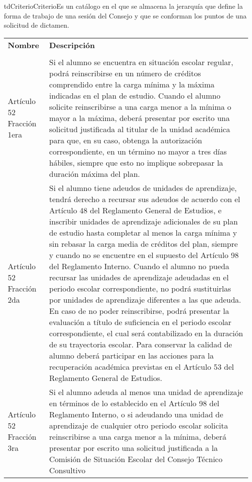 \begin{TipoDeDato}{tdCriterio}{Criterio}{Es un catálogo en el que se almacena la jerarquía que define la forma de trabajo de una sesión del Consejo y que se conforman los puntos de una solicitud de dictamen.}
		\begin{longtable}{| p{} | p{} |}
	 			\rowcolor{colorPrincipal}
	 			\multicolumn{2}{|c|}{\bf \color{white} Valores Iniciales}\\
	 			\hline
	 			\rowcolor{colorSecundario}
	 			\bf \color{white} Nombre  & \bf \color{white}Descripción \\
	 			\hline
	 			\endhead
	 			\rowcolor{colorSecundario}
	 			\multicolumn{2}{|c|}{\color{white}Los criterios aplicables al CGC son}\\
	 			\hline
	 			 Artículo 52 Fracción 1era & Si  el  alumno  se  encuentra  en  situación  escolar regular,  podrá  reinscribirse  en  un  número de créditos  comprendido  entre  la  carga  mínima  y  la máxima indicadas en el plan de estudio.  Cuando el alumno solicite reinscribirse a una carga menor  a  la  mínima  o  mayor  a  la  máxima,  deberá presentar  por  escrito  una  solicitud  justificada  al titular de la unidad académica para que, en su caso, 
obtenga  la  autorización  correspondiente,  en  un término no mayor a tres días hábiles, siempre que  esto  no  implique  sobrepasar  la  duración  máxima del plan. \\
	 			\hline
	 			Artículo 52 Fracción 2da  &  Si el alumno tiene adeudos de unidades de aprendizaje, tendrá derecho a recursar sus adeudos de acuerdo con el Artículo 48 del Reglamento General de Estudios, e inscribir unidades de aprendizaje adicionales de su plan de estudio hasta completar al menos la carga mínima y sin rebasar la carga media de créditos del plan, siempre y cuando no se encuentre en el supuesto del Artículo 98 del Reglamento Interno. Cuando el alumno no pueda recursar las unidades de aprendizaje adeudadas en el periodo escolar correspondiente, no podrá sustituirlas por unidades de aprendizaje diferentes a las que adeuda. En caso de no poder reinscribirse, podrá presentar la evaluación a título de suficiencia en el periodo escolar correspondiente, el cual será contabilizado en la duración de su trayectoria escolar. Para conservar la calidad de alumno deberá participar en las acciones para la recuperación académica previstas en el Artículo 53 del Reglamento General de Estudios. \\
	 			\hline
	 			Artículo 52 Fracción 3ra & Si el alumno adeuda al menos una unidad de aprendizaje en términos de lo establecido en el Artículo 98 del Reglamento Interno, o si adeudando una unidad de aprendizaje de cualquier otro periodo escolar solicita reinscribirse a una carga menor a la mínima, deberá presentar por escrito una solicitud justificada a la Comisión de Situación Escolar del Consejo Técnico Consultivo

\end{longtable}
\end{TipoDeDato}
